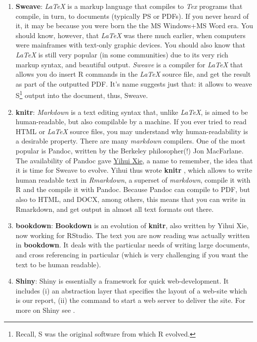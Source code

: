 \documentclass[]{book}
\theoremstyle{definition}
\theoremstyle{definition}
\theoremstyle{definition}
\theoremstyle{remark}
\begin{document}
\begin{enumerate}
\def\labelenumi{\arabic{enumi}.}
\item
  \textbf{Sweave}: \emph{LaTeX} is a markup language that compiles to
  \emph{Tex} programs that compile, in turn, to documents (typically PS
  or PDFs). If you never heard of it, it may be because you were born
  the the MS Windows+MS Word era. You should know, however, that
  \emph{LaTeX} was there much earlier, when computers were mainframes
  with text-only graphic devices. You should also know that \emph{LaTeX}
  is still very popular (in some communities) due to its very rich
  markup syntax, and beautiful output. \emph{Sweave}
  \citep{leisch2002sweave} is a compiler for \emph{LaTeX} that allows
  you do insert R commands in the \emph{LaTeX} source file, and get the
  result as part of the outputted PDF. It's name suggests just that: it
  allows to weave S\footnote{Recall, S was the original software from
    which R evolved.} output into the document, thus, Sweave.
\item
  \textbf{knitr}: \emph{Markdown} is a text editing syntax that, unlike
  \emph{LaTeX}, is aimed to be human-readable, but also compilable by a
  machine. If you ever tried to read HTML or \emph{LaTeX} source files,
  you may understand why human-readability is a desirable property.
  There are many \emph{markdown} compilers. One of the most popular is
  Pandoc, written by the Berkeley philosopher(!) Jon MacFarlane. The
  availability of Pandoc gave \href{https://yihui.name/}{Yihui Xie}, a
  name to remember, the idea that it is time for Sweave to evolve. Yihui
  thus wrote \textbf{knitr} \citep{xie2015dynamic}, which allows to
  write human readable text in \emph{Rmarkdown}, a superset of
  \emph{markdown}, compile it with R and the compile it with Pandoc.
  Because Pandoc can compile to PDF, but also to HTML, and DOCX, among
  others, this means that you can write in Rmarkdown, and get output in
  almost all text formats out there.
\item
  \textbf{bookdown}: \textbf{Bookdown} \citep{xie2016bookdown} is an
  evolution of \textbf{knitr}, also written by Yihui Xie, now working
  for RStudio. The text you are now reading was actually written in
  \textbf{bookdown}. It deals with the particular needs of writing large
  documents, and cross referencing in particular (which is very
  challenging if you want the text to be human readable).
\item
  \textbf{Shiny}: Shiny is essentially a framework for quick
  web-development. It includes (i) an abstraction layer that specifies
  the layout of a web-site which is our report, (ii) the command to
  start a web server to deliver the site. For more on Shiny see
  \citet{shiny}.
\end{enumerate}
\end{document}
